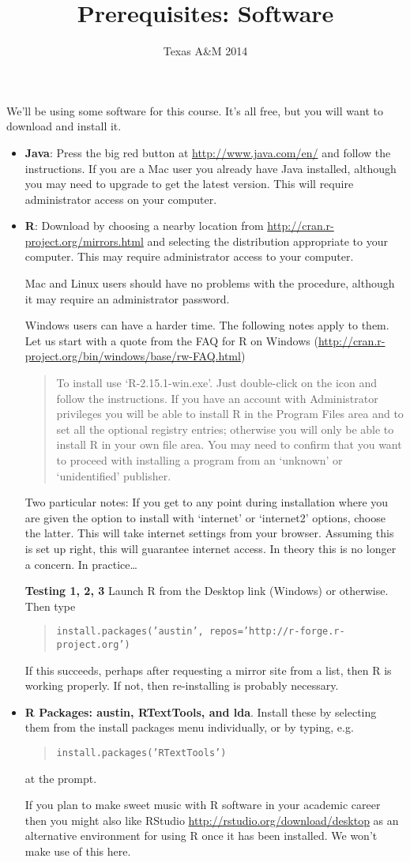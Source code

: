 \documentclass[10pt,a4paper]{article}
\author{Texas A\&M 2014}
\title{Prerequisites: Software}
\date{}
\begin{document}
\maketitle

We'll be using some software for this course.  It's all free, but you will want to download and install it.

\begin{itemize}
\item \textbf{Java}: Press the big red button at \url{http://www.java.com/en/} and follow the instructions.  If you are a Mac user you already have Java installed, although you may need to upgrade to get the latest version.  This will require administrator access on your computer. 
\item \textbf{R}: Download by choosing a nearby location from \url{http://cran.r-project.org/mirrors.html} and selecting the distribution appropriate to your computer.  This may require administrator access to your computer.

Mac and Linux users should have no problems with the procedure, although it may require an administrator password.  

Windows users can have a harder time.  The following notes apply to them.  Let us start with a quote from the FAQ for R on Windows (\url{http://cran.r-project.org/bin/windows/base/rw-FAQ.html})
\begin{quote}
To install use `R-2.15.1-win.exe'. Just double-click on the icon and follow the instructions. If you have an account with Administrator privileges you will be able to install R in the Program Files area and to set all the optional registry entries; otherwise you will only be able to install R in your own file area. You may need to confirm that you want to proceed with installing a program from an `unknown' or `unidentified' publisher.
\end{quote}
Two particular notes:  If you get to any point during installation where you are given the option to install with `internet' or `internet2' options, choose the latter.  This will take internet settings from your browser.  Assuming this is set up right, this will guarantee internet access.  In theory this is no longer a concern. In practice\ldots

\textbf{Testing 1, 2, 3} Launch R from the Desktop link (Windows) or otherwise.  Then type
\begin{quote}
\texttt{install.packages('austin', repos='http://r-forge.r-project.org')}
\end{quote}
If this succeeds, perhaps after requesting a mirror site from a list, then R is working properly.  If not, then re-installing is probably necessary.
\item \textbf{R Packages: austin, RTextTools, and lda}.  Install these by selecting them from the install packages menu individually, or by typing, e.g. 
\begin{quote}
\texttt{install.packages('RTextTools')}
\end{quote}
at the prompt. 

If you plan to make sweet music with R software in your academic career then you might also like RStudio \url{http://rstudio.org/download/desktop} as an alternative environment for using R once it has been installed.  We won't make use of this here.
\end{itemize}
\end{document}
